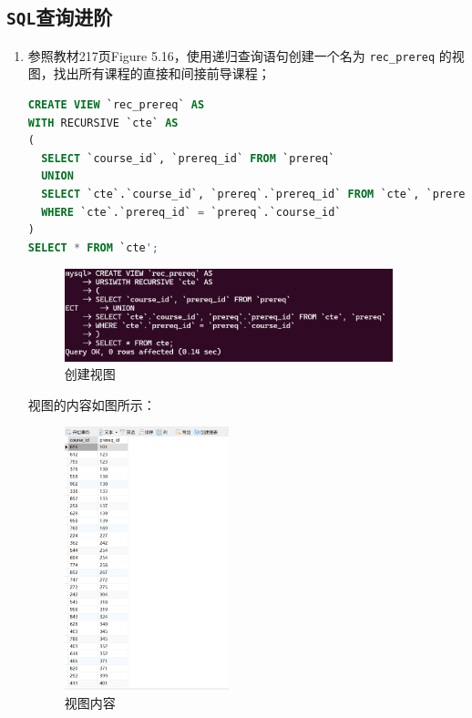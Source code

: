 \documentclass{article}
\renewcommand\tt{\texttt}
\begin{document}
\subsection{\tt{SQL}查询进阶}

\begin{enumerate}
\item 参照教材217页Figure 5.16，使用递归查询语句创建一个名为 \tt{rec\_prereq} 的视图，找出所有课程的直接和间接前导课程；

\begin{lstlisting}[language=sql]
CREATE VIEW `rec_prereq` AS
WITH RECURSIVE `cte` AS
(
  SELECT `course_id`, `prereq_id` FROM `prereq`
  UNION
  SELECT `cte`.`course_id`, `prereq`.`prereq_id` FROM `cte`, `prereq`
  WHERE `cte`.`prereq_id` = `prereq`.`course_id`
)
SELECT * FROM `cte';
\end{lstlisting}

\begin{figure}[H]
  \centering
  \includegraphics[width=0.9\textwidth]{img/25.png}
  \caption{创建视图}
\end{figure}

视图的内容如图所示：

\begin{figure}[H]
  \centering
  \includegraphics[width=0.45\textwidth]{img/26.png}
  \caption{视图内容}
\end{figure}


\end{enumerate}
\end{document}
